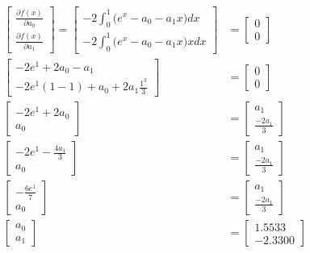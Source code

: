 \begin{align*}
\begin{bmatrix}
    \frac{\partial f(x)}{\partial a_0} \\ 
    \frac{\partial f(x)}{\partial a_1}
\end{bmatrix} =
\begin{bmatrix}
    -2 \int_{0}^{1} \Big( e^x - a_0 - a_1 x\Big) dx \\
    -2 \int_{0}^{1} \Big( e^x - a_0 - a_1 x\Big)x dx
\end{bmatrix} &= 
\begin{bmatrix}
    0 \\ 0
\end{bmatrix} \\
\begin{bmatrix}
    -2 e^1 +2a_0 -a_1 \\
    -2 e^1(1-1) +a_0 + 2a_1 \frac{1^3}{3}
\end{bmatrix} &= 
\begin{bmatrix}
0 \\ 0
\end{bmatrix} \\
\begin{bmatrix}
-2 e^1 +2a_0  \\
a_0
\end{bmatrix} &= 
\begin{bmatrix}
a_1 \\ \frac{-2a_1}{3}
\end{bmatrix} \\
\begin{bmatrix}
-2 e^1 - \frac{4a_1}{3}  \\
a_0
\end{bmatrix} &= 
\begin{bmatrix}
a_1 \\ \frac{-2a_1}{3}
\end{bmatrix} \\
\begin{bmatrix}
-\frac{6 e^1}{7}  \\
a_0
\end{bmatrix} &= 
\begin{bmatrix}
a_1\\ \frac{-2a_1}{3}
\end{bmatrix} \\
\begin{bmatrix}
a_0 \\ a_1
\end{bmatrix} &= 
\begin{bmatrix}
 1.5533 \\ -2.3300
\end{bmatrix} 
\end{align*}










